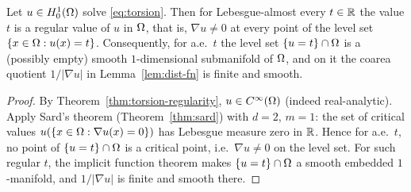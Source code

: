 \begin{lemma}\label{lem:regular-values}
Let $u\in H^1_0(\Omega)$ solve \eqref{eq:torsion}. Then for Lebesgue-almost every
$t\in\mathbb{R}$ the value $t$ is a regular value of $u$ in $\Omega$, that is,
$\nabla u\ne0$ at every point of the level set $\{x\in\Omega:u(x)=t\}$.
Consequently, for a.e.\ $t$ the level set $\{u=t\}\cap\Omega$ is a (possibly
empty) smooth $1$-dimensional submanifold of $\Omega$, and on it the coarea
quotient $1/|\nabla u|$ in Lemma~\ref{lem:dist-fn} is finite and smooth.
\end{lemma}

\begin{proof}
By Theorem~\ref{thm:torsion-regularity}, $u\in C^\infty(\Omega)$ (indeed
real-analytic). Apply Sard's theorem (Theorem~\ref{thm:sard}) with $d=2$,
$m=1$: the set of critical values $u(\{x\in\Omega:\nabla u(x)=0\})$ has Lebesgue
measure zero in $\mathbb{R}$. Hence for a.e.\ $t$, no point of $\{u=t\}\cap\Omega$ is a
critical point, i.e.\ $\nabla u\ne0$ on the level set. For such regular $t$,
the implicit function theorem makes $\{u=t\}\cap\Omega$ a smooth embedded
$1$-manifold, and $1/|\nabla u|$ is finite and smooth there.
\end{proof}
